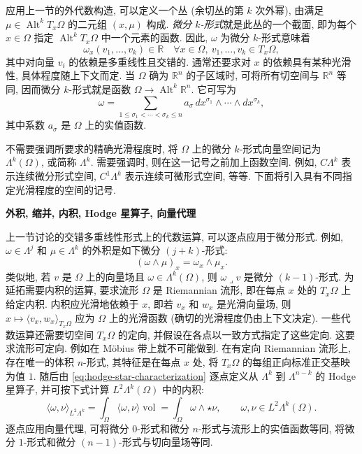 {应用上一节的外代数构造, 可以定义一个丛 (余切丛的第 $k$ 次外幂), 由满足 $\mu\in\operatorname{Alt}^kT_x\Omega$ 的二元组 $(x,\mu)$ 构成. \emph{微分 $k$-形式}就是此丛的一个截面, 即为每个 $x\in\Omega$ 指定 $\operatorname{Alt}^kT_x\Omega$ 中一个元素的函数. 因此, $\omega$ 为微分 $k$-形式意味着}
\[
\omega_x(v_1,\ldots,v_k)\in\mathbb R\quad\forall x\in\Omega,\ v_1,\ldots,v_k\in T_x\Omega,
\]
{其中对向量 $v_i$ 的依赖是多重线性且交错的. 通常还要求对 $x$ 的依赖具有某种光滑性, 具体程度随上下文而定. 当 $\Omega$ 确为 $\mathbb R^n$ 的子区域时, 可将所有切空间与 $\mathbb R^n$ 等同, 因而微分 $k$-形式就是函数 $\Omega\to\operatorname{Alt}^k\mathbb R^n$. 它可写为}
\begin{equation}\label{eq:differential-form-coordinates}
\omega=\sum_{1\leq\sigma_1<\cdots<\sigma_k\leq n}a_\sigma\,dx^{\sigma_1}\wedge\cdots\wedge dx^{\sigma_k},
\end{equation}
{其中系数 $a_\sigma$ 是 $\Omega$ 上的实值函数.}

{不需要强调所要求的精确光滑程度时, 将 $\Omega$ 上的微分 $k$-形式向量空间记为 $\Lambda^k(\Omega)$, 或简称 $\Lambda^k$. 需要强调时, 则在这一记号之前加上函数空间. 例如, $C\Lambda^k$ 表示连续微分形式空间, $C^1\Lambda^k$ 表示连续可微形式空间, 等等. 下面将引入具有不同指定光滑程度的空间的记号.}

\medskip\noindent\textbf{{外积, 缩并, 内积, Hodge 星算子, 向量代理}}\par
{上一节讨论的交错多重线性形式上的代数运算, 可以逐点应用于微分形式. 例如, $\omega\in\Lambda^j$ 和 $\mu\in\Lambda^k$ 的外积是如下微分 $(j+k)$-形式:}
\[
(\omega\wedge\mu)_x=\omega_x\wedge\mu_x.
\]
{类似地, 若 $v$ 是 $\Omega$ 上的向量场且 $\omega\in\Lambda^k(\Omega)$, 则 $\omega\lrcorner v$ 是微分 $(k-1)$-形式. 为延拓需要内积的运算, 要求流形 $\Omega$ 是 Riemannian 流形, 即在每点 $x$ 处的 $T_x\Omega$ 上给定内积. 内积应光滑地依赖于 $x$, 即若 $v_x$ 和 $w_x$ 是光滑向量场, 则 $x\mapsto\langle v_x,w_x\rangle_{T_x\Omega}$ 应为 $\Omega$ 上的光滑函数 (确切的光滑程度仍由上下文决定). 一些代数运算还需要切空间 $T_x\Omega$ 的定向, 并假设在各点以一致方式指定了这些定向. 这要求流形可定向. 例如在 Möbius 带上就不可能做到. 在有定向 Riemannian 流形上, 存在唯一的体积 $n$-形式, 其特征是在每点 $x$ 处, 将 $T_x\Omega$ 的每组正向标准正交基映为值 $1$. 随后由 \eqref{eq:hodge-star-characterization} 逐点定义从 $\Lambda^k$ 到 $\Lambda^{n-k}$ 的 Hodge 星算子, 并可按下式计算 $L^2\Lambda^k(\Omega)$ 中的内积:}
\[
\langle\omega,\nu\rangle_{L^2\Lambda^k}=\int_\Omega\langle\omega,\nu\rangle\operatorname{vol}=\int_\Omega\omega\wedge\star\nu,\qquad\omega,\nu\in L^2\Lambda^k(\Omega).
\]
{逐点应用向量代理, 可将微分 $0$-形式和微分 $n$-形式与流形上的实值函数等同, 将微分 $1$-形式和微分 $(n-1)$-形式与切向量场等同.}

